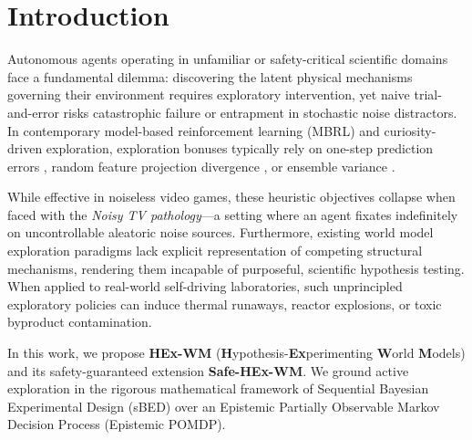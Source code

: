 \section{Introduction}
\label{sec:intro}

Autonomous agents operating in unfamiliar or safety-critical scientific domains face a fundamental dilemma: discovering the latent physical mechanisms governing their environment requires exploratory intervention, yet naive trial-and-error risks catastrophic failure or entrapment in stochastic noise distractors. In contemporary model-based reinforcement learning (MBRL) and curiosity-driven exploration, exploration bonuses typically rely on one-step prediction errors \citep{pathak2017curiosity}, random feature projection divergence \citep{burda2018exploration}, or ensemble variance \citep{sekar2020planning}.

While effective in noiseless video games, these heuristic objectives collapse when faced with the \emph{Noisy TV pathology}---a setting where an agent fixates indefinitely on uncontrollable aleatoric noise sources. Furthermore, existing world model exploration paradigms lack explicit representation of competing structural mechanisms, rendering them incapable of purposeful, scientific hypothesis testing. When applied to real-world self-driving laboratories, such unprincipled exploratory policies can induce thermal runaways, reactor explosions, or toxic byproduct contamination.

In this work, we propose \textbf{HEx-WM} (\textbf{H}ypothesis-\textbf{Ex}perimenting \textbf{W}orld \textbf{M}odels) and its safety-guaranteed extension \textbf{Safe-HEx-WM}. We ground active exploration in the rigorous mathematical framework of Sequential Bayesian Experimental Design (sBED) \citep{lindley1956measure} over an Epistemic Partially Observable Markov Decision Process (Epistemic POMDP). 

